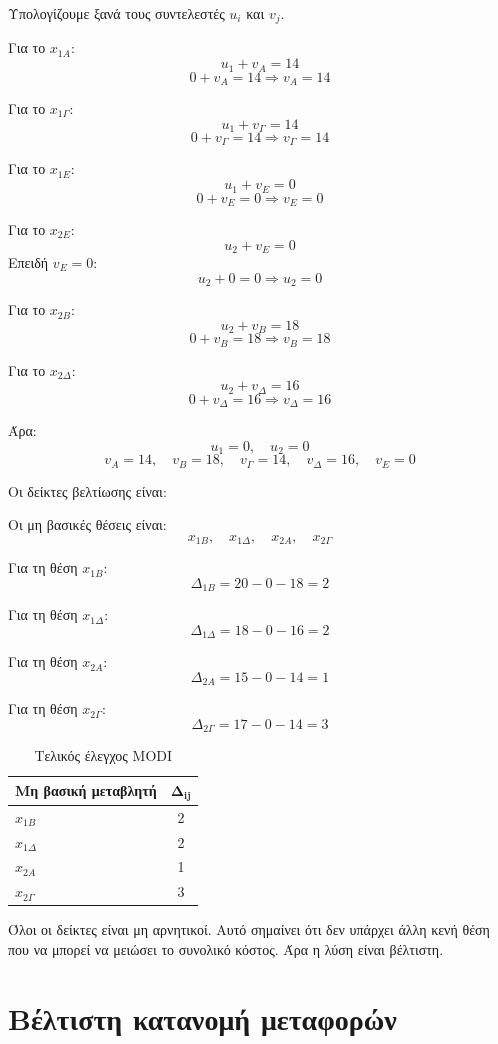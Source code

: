 \documentclass[12pt,a4paper]{article}
\begin{document}
Υπολογίζουμε ξανά τους συντελεστές \(u_i\) και \(v_j\).

Για το \(x_{1A}\):
\[
u_1+v_A=14
\]
\[
0+v_A=14 \Rightarrow v_A=14
\]

Για το \(x_{1\Gamma}\):
\[
u_1+v_\Gamma=14
\]
\[
0+v_\Gamma=14 \Rightarrow v_\Gamma=14
\]

Για το \(x_{1E}\):
\[
u_1+v_E=0
\]
\[
0+v_E=0 \Rightarrow v_E=0
\]

Για το \(x_{2E}\):
\[
u_2+v_E=0
\]
Επειδή \(v_E=0\):
\[
u_2+0=0 \Rightarrow u_2=0
\]

Για το \(x_{2B}\):
\[
u_2+v_B=18
\]
\[
0+v_B=18 \Rightarrow v_B=18
\]

Για το \(x_{2\Delta}\):
\[
u_2+v_\Delta=16
\]
\[
0+v_\Delta=16 \Rightarrow v_\Delta=16
\]

Άρα:
\[
u_1=0,\quad u_2=0
\]
\[
v_A=14,\quad v_B=18,\quad v_\Gamma=14,\quad v_\Delta=16,\quad v_E=0
\]

Οι δείκτες βελτίωσης είναι:

Οι μη βασικές θέσεις είναι:
\[
x_{1B},\quad x_{1\Delta},\quad x_{2A},\quad x_{2\Gamma}
\]

Για τη θέση \(x_{1B}\):
\[
\Delta_{1B}=20-0-18=2
\]

Για τη θέση \(x_{1\Delta}\):
\[
\Delta_{1\Delta}=18-0-16=2
\]

Για τη θέση \(x_{2A}\):
\[
\Delta_{2A}=15-0-14=1
\]

Για τη θέση \(x_{2\Gamma}\):
\[
\Delta_{2\Gamma}=17-0-14=3
\]

\begin{table}[H]
\centering
\caption{Τελικός έλεγχος MODI}
\begin{tabular}{lc}
\toprule
\textbf{Μη βασική μεταβλητή} & \(\boldsymbol{\Delta_{ij}}\) \\
\midrule
\(x_{1B}\) & 2 \\
\(x_{1\Delta}\) & 2 \\
\(x_{2A}\) & 1 \\
\(x_{2\Gamma}\) & 3 \\
\bottomrule
\end{tabular}
\end{table}

Όλοι οι δείκτες είναι μη αρνητικοί. Αυτό σημαίνει ότι δεν υπάρχει άλλη κενή θέση που να μπορεί να μειώσει το συνολικό κόστος. Άρα η λύση είναι βέλτιστη.

\section{Βέλτιστη κατανομή μεταφορών}
\end{document}

